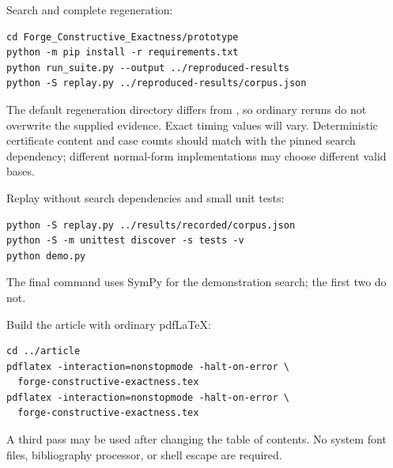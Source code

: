 \documentclass[11pt,letterpaper]{article}
\theoremstyle{definition}\newtheorem{definition}[theorem]{Definition}
\theoremstyle{remark}\newtheorem{remark}[theorem]{Remark}
\newcommand{\code}[1]{\texttt{\detokenize{#1}}}
\begin{document}
Search and complete regeneration:
\begin{lstlisting}
cd Forge_Constructive_Exactness/prototype
python -m pip install -r requirements.txt
python run_suite.py --output ../reproduced-results
python -S replay.py ../reproduced-results/corpus.json
\end{lstlisting}
The default regeneration directory differs from \code{results/recorded}, so
ordinary reruns do not overwrite the supplied evidence. Exact timing values
will vary. Deterministic certificate content and case counts should match with
the pinned search dependency; different normal-form implementations may choose
different valid bases.

Replay without search dependencies and small unit tests:
\begin{lstlisting}
python -S replay.py ../results/recorded/corpus.json
python -S -m unittest discover -s tests -v
python demo.py
\end{lstlisting}
The final command uses SymPy for the demonstration search; the first two do not.

Build the article with ordinary pdfLaTeX:
\begin{lstlisting}
cd ../article
pdflatex -interaction=nonstopmode -halt-on-error \
  forge-constructive-exactness.tex
pdflatex -interaction=nonstopmode -halt-on-error \
  forge-constructive-exactness.tex
\end{lstlisting}
A third pass may be used after changing the table of contents. No system font
files, bibliography processor, or shell escape are required.
\end{document}
